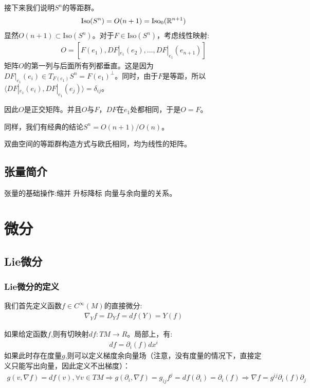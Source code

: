 \begin{example}[$S^n$]
    接下来我们说明$S^n$的等距群。
    \begin{align*}
        \mathrm{Iso}(S^n)=O(n+1)=\mathrm{Iso}_0(\mathbb{R}^{n+1})
    \end{align*}
    显然$O(n+1) \subset \mathrm{Iso}(S^n)$。对于$F \in \mathrm{Iso}(S^n)$，考虑线性映射:
    \begin{align*}
        O=[ F(e_1),DF|_{e_1}(e_2),\dots,DF|_{e_1}(e_{n+1})]
    \end{align*}
    矩阵$O$的第一列与后面所有列都垂直。这是因为$DF|_{e_1}(e_i) \in T_{F(e_1)}S^n=F(e_1)^{\bot}$。同时，由于$F$是等距，所以$\langle DF|_{e_1}(e_i),DF|_{e_1}(e_j)\rangle=\delta_{ij}$。

    因此$O$是正交矩阵。并且$O$与$F$，$DF$在$e_1$处都相同，于是$O=F$。

    同样，我们有经典的结论$S^n=O(n+1)/O(n)$。
\end{example}
\begin{example}[双曲空间]
    双曲空间的等距群构造方式与欧氏相同，均为线性的矩阵。
\end{example}
\section{张量简介}
张量的基础操作:缩并 升标降标 向量与余向量的关系。
\chapter{微分}
\section{Lie微分}
\subsection{Lie微分的定义}
我们首先定义函数$f \in C^\infty(M)$的直接微分:
\begin{align*}
    \nabla_Y f=D_Y f=df(Y)=Y(f)
\end{align*}

如果给定函数$f$,则有切映射$df:TM \to R$。局部上，有:
\begin{align*}
    df=\partial_i (f)dx^i
\end{align*}
如果此时存在度量$g$,则可以定义梯度余向量场（注意，没有度量的情况下，直接定义只能写出向量，因此定义不出梯度）：
\begin{align*}
    g(v,\nabla f)=df(v),\forall v \in TM \Rightarrow g(\partial_i,\nabla f)=g_{ij}f^j=df(\partial_i)=\partial_i(f) \Rightarrow \nabla f=g^{ij}\partial_i(f)\partial_j
\end{align*}


